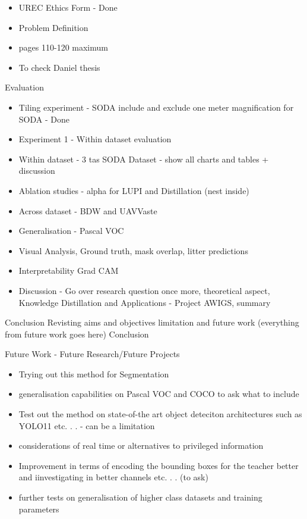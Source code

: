 \begin{itemize}
    \item UREC Ethics Form - Done
    \item Problem Definition
    \item pages 110-120 maximum
    \item To check Daniel thesis
\end{itemize}

Evaluation
\begin{itemize}
    \item Tiling experiment - SODA include and exclude one meter magnification for SODA - Done

    \item Experiment 1 - Within dataset evaluation
    \item Within dataset - 3 tas SODA Dataset - show all charts and tables + discussion
    \item Ablation studies - alpha for LUPI and Distillation (nest inside)
    \item Across dataset - BDW and UAVVaste
    \item Generalisation - Pascal VOC
    \item Visual Analysis, Ground truth, mask overlap, litter predictions
    \item Interpretability Grad CAM
    \item Discussion - Go over research question once more, theoretical aspect, Knowledge Distillation and Applications - Project AWIGS, summary
\end{itemize}

Conclusion
Revisting aims and objectives
limitation and future work (everything from future work goes here)
Conclusion

Future Work - Future Research/Future Projects
\begin{itemize}
    \item Trying out this method for Segmentation
    \item generalisation capabilities on Pascal VOC and COCO to ask what to include
    \item Test out the method on state-of-the art object deteciton architectures such as YOLO11 etc. . . - can be a limitation
    \item considerations of real time or alternatives to privileged information
    \item Improvement in terms of encoding the bounding boxes for the teacher better and iinvestigating in better channels etc. . . (to ask)
    \item further tests on generalisation of higher class datasets and training parameters
\end{itemize}


